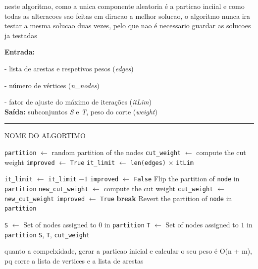 \documentclass[mirror, portugues]{revdetua}
\begin{document}
neste algoritmo, como a unica componente aleatoria é a particao inciial e como todas as alteracoes sao feitas em diracao a melhor solucao, o algoritmo nunca ira testar a mesma solucao duas vezes, pelo que nao é necessario guardar as solucoes ja testadas

\begin{algorithm}[H]
\raggedright
\textbf{Entrada:}

- lista de arestas e respetivos pesos (\textit{edges})

- número de vértices (\textit{n\_nodes})

- fator de ajuste do máximo de iterações (\textit{itLim})\\
\textbf{Saída:} subconjuntos \textit{S} e \textit{T}, peso do corte (\textit{weight}) \\
\hrule 
\caption{NOME DO ALGORTIMO}
\begin{algorithmic}[1]
    \State \texttt{partition} $\gets$ random partition of the nodes
    \State \texttt{cut\_weight} $\gets$ compute the cut weight
    \State \texttt{improved} $\gets$ \texttt{True}
    \State \texttt{it\_limit} $\gets$ \texttt{len(edges)} \ensuremath{\times} \texttt{itLim}

        \State \texttt{it\_limit} $\gets$ \texttt{it\_limit} $ - 1$
        \State \texttt{improved} $\gets$ \texttt{False}
            \State Flip the partition of \texttt{node} in \texttt{partition}
            \State \texttt{new\_cut\_weight} $\gets$ compute the cut weight
                \State \texttt{cut\_weight} $\gets$ \texttt{new\_cut\_weight}
                \State \texttt{improved} $\gets$ \texttt{True}
                \State \textbf{break}  
            \EndIf
            \State Revert the partition of \texttt{node} in \texttt{partition}
        \EndFor
    \EndWhile

    \State \texttt{S} $\gets$ Set of nodes assigned to $0$ in \texttt{partition}
    \State \texttt{T} $\gets$ Set of nodes assigned to $1$ in \texttt{partition}
    \Return \texttt{S}, \texttt{T}, \texttt{cut\_weight}
\end{algorithmic}
\end{algorithm}
    
quanto a compelxidade, gerar a particao inicial e calcular o seu peso é O(n + m), pq corre a lista de vertices e a lista de arestas
\end{document}
